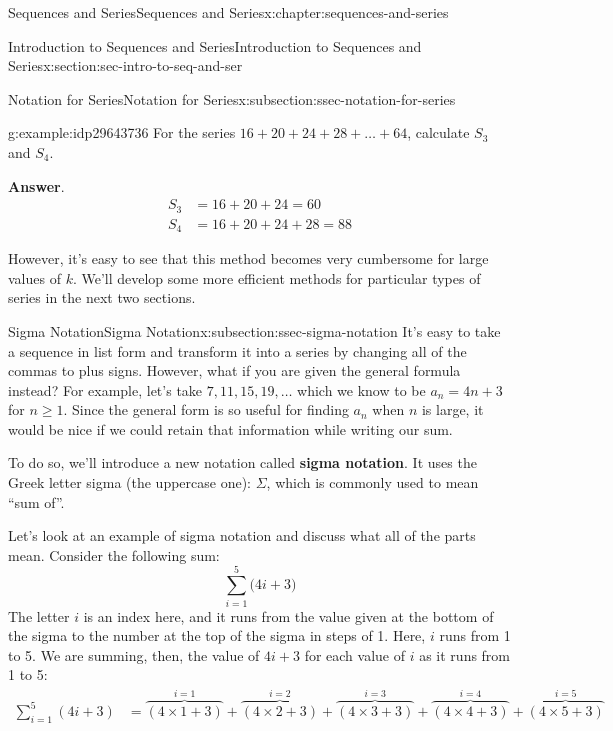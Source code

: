 \documentclass[twoside,10pt,]{book}
\newcommand{\blocktitlefont}{\relax}
\newcommand{\terminology}[1]{\textbf{#1}}
\numberwithin{equation}{section}
\newcommand{\amp}{&}
\begin{document}
\begin{chapterptx}{Sequences and Series}{}{Sequences and Series}{}{}{x:chapter:sequences-and-series}
\begin{sectionptx}{Introduction to Sequences and Series}{}{Introduction to Sequences and Series}{}{}{x:section:sec-intro-to-seq-and-ser}
\begin{subsectionptx}{Notation for Series}{}{Notation for Series}{}{}{x:subsection:ssec-notation-for-series}
\begin{example}{}{g:example:idp29643736}
For the series \(16 + 20 + 24 + 28 + \ldots + 64\), calculate \(S_3\) and \(S_4\).\par\smallskip%
\noindent\textbf{\blocktitlefont Answer}.\label{g:answer:idp29638616}{}\hypertarget{g:answer:idp29638616}{}\quad{}%
\begin{align*}
S_3 \amp = 16 + 20 + 24 = 60\\
S_4 \amp = 16 + 20 + 24 + 28 = 88
\end{align*}
\end{example}
%
\par
However, it's easy to see that this method becomes very cumbersome for large values of \(k\).  We'll develop some more efficient methods for particular types of series in the next two sections.%
\end{subsectionptx}
%
%
\typeout{************************************************}
\typeout{************************************************}
%
\begin{subsectionptx}{Sigma Notation}{}{Sigma Notation}{}{}{x:subsection:ssec-sigma-notation}
It's easy to take a sequence in list form and transform it into a series by changing all of the commas to plus signs.  However, what if you are given the general formula instead?  For example, let's take \(7, 11, 15, 19, \ldots\)   which we know to be \({a_n} = 4n + 3\) for \(n \ge 1\).  Since the general form is so useful for finding \(a_n\) when \(n\) is large, it would be nice if we could retain that information while writing our sum.%
\par
To do so, we'll introduce a new notation called \terminology{sigma notation}.  It uses the Greek letter sigma (the uppercase one):  \(\Sigma\), which is commonly used to mean ``sum of''.%
\par
Let's look at an example of sigma notation and discuss what all of the parts mean.  Consider the following sum:%
\begin{equation*}
\sum\limits_{i = 1}^5 {(4i + 3} )
\end{equation*}
The letter \(i\) is an index here, and it runs from the value given at the bottom of the sigma to the number at the top of the sigma in steps of 1.  Here, \(i\) runs from 1 to 5.  We are summing, then, the value of \(4i + 3\) for each value of \(i\) as it runs from 1 to 5:%
\begin{align*}
\sum\limits_{i = 1}^5 {(4i + 3)}  \amp = \overbrace {\left( {4 \times 1 + 3} \right)}^{i = 1} + \overbrace {\left( {4 \times 2 + 3} \right)}^{i = 2} + \overbrace {\left( {4 \times 3 + 3} \right)}^{i = 3} + \overbrace {\left( {4 \times 4 + 3} \right)}^{i = 4} + \overbrace {\left( {4 \times 5 + 3} \right)}^{i = 5}\\

\end{align*}
\end{subsectionptx}
\end{sectionptx}
\end{chapterptx}
\end{document}
